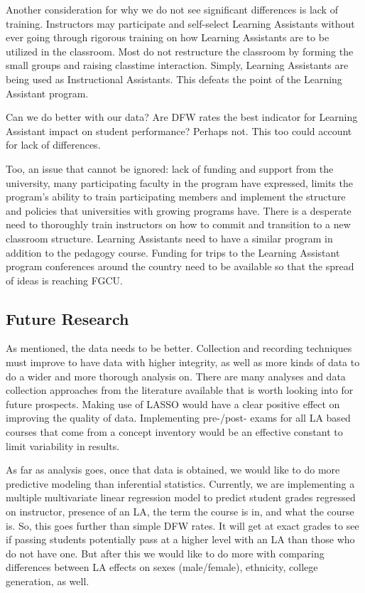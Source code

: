 \documentclass[]{article}
\begin{document}
Another consideration for why we do not see significant differences is
lack of training. Instructors may participate and self-select Learning
Assistants without ever going through rigorous training on how Learning
Assistants are to be utilized in the classroom. Most do not restructure
the classroom by forming the small groups and raising classtime
interaction. Simply, Learning Assistants are being used as Instructional
Assistants. This defeats the point of the Learning Assistant program.

Can we do better with our data? Are DFW rates the best indicator for
Learning Assistant impact on student performance? Perhaps not. This too
could account for lack of differences.

Too, an issue that cannot be ignored: lack of funding and support from
the university, many participating faculty in the program have
expressed, limits the program's ability to train participating members
and implement the structure and policies that universities with growing
programs have. There is a desperate need to thoroughly train instructors
on how to commit and transition to a new classroom structure. Learning
Assistants need to have a similar program in addition to the pedagogy
course. Funding for trips to the Learning Assistant program conferences
around the country need to be available so that the spread of ideas is
reaching FGCU.

\hypertarget{future-research}{%
\subsection{Future Research}\label{future-research}}

As mentioned, the data needs to be better. Collection and recording
techniques must improve to have data with higher integrity, as well as
more kinds of data to do a wider and more thorough analysis on. There
are many analyses and data collection approaches from the literature
available that is worth looking into for future prospects. Making use of
LASSO would have a clear positive effect on improving the quality of
data. Implementing pre-/post- exams for all LA based courses that come
from a concept inventory would be an effective constant to limit
variability in results. \cite{VanDusen1}

As far as analysis goes, once that data is obtained, we would like to do
more predictive modeling than inferential statistics. Currently, we are
implementing a multiple multivariate linear regression model to predict
student grades regressed on instructor, presence of an LA, the term the
course is in, and what the course is. So, this goes further than simple
DFW rates. It will get at exact grades to see if passing students
potentially pass at a higher level with an LA than those who do not have
one. But after this we would like to do more with comparing differences
between LA effects on sexes (male/female), ethnicity, college
generation, as well. \cite{VanDusen2}
\end{document}
